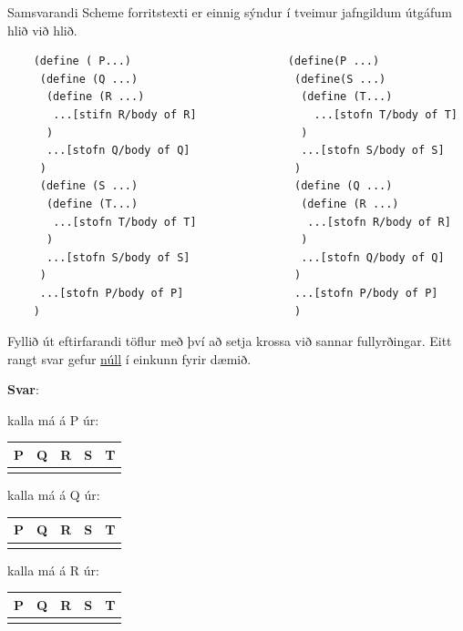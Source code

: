 \documentclass{article}
\begin{document}
     Samsvarandi Scheme forritstexti er einnig sýndur í tveimur jafngildum útgáfum 
     hlið við hlið. 

     \begin{verbatim}
    (define ( P...)                        (define(P ...)
     (define (Q ...)                        (define(S ...)
      (define (R ...)                        (define (T...)
       ...[stifn R/body of R]                  ...[stofn T/body of T]
      )                                      )
      ...[stofn Q/body of Q]                 ...[stofn S/body of S]
     )                                      )
     (define (S ...)                        (define (Q ...)
      (define (T...)                         (define (R ...)
       ...[stofn T/body of T]                 ...[stofn R/body of R]
      )                                      )
      ...[stofn S/body of S]                 ...[stofn Q/body of Q]
     )                                      )
     ...[stofn P/body of P]                 ...[stofn P/body of P]
    )                                       )
     \end{verbatim}
    
     Fyllið út eftirfarandi töflur með því að setja krossa við sannar fullyrðingar.
     Eitt rangt svar gefur \underline{núll} í einkunn fyrir dæmið.

     \textbf{Svar}:

     kalla má á P úr:


     \begin{tabularx}{\textwidth}{ |X|X|X|X|X|}
        \hline
        \textbf{P}  & \textbf{Q}  & \textbf{R}  & \textbf{S}  & \textbf{T} \\ \hline
         & & & & \\ \hline
     \end{tabularx}


     kalla má á Q úr:

     
     \begin{tabularx}{\textwidth}{ |X|X|X|X|X|}
        \hline
        \textbf{P}  & \textbf{Q}  & \textbf{R}  & \textbf{S}  & \textbf{T} \\ \hline
         & & & & \\ \hline
     \end{tabularx}


     kalla má á R úr:

     
     \begin{tabularx}{\textwidth}{ |X|X|X|X|X|}
        \hline
        \textbf{P}  & \textbf{Q}  & \textbf{R}  & \textbf{S}  & \textbf{T} \\ \hline
         & & & & \\ \hline
     \end{tabularx}
\end{document}
